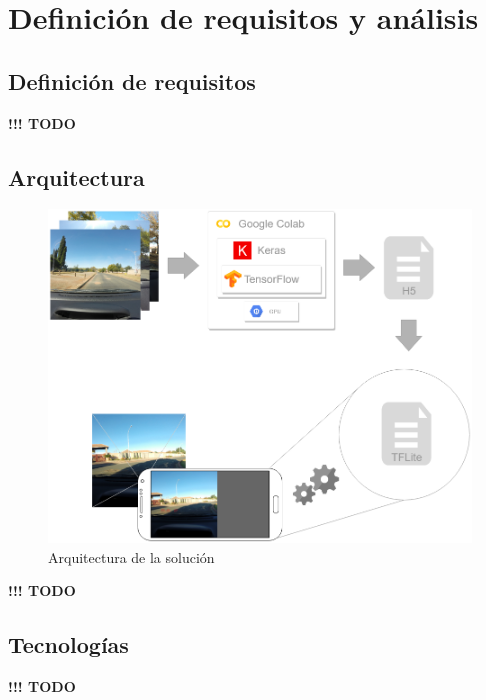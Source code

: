 \section{Definición de requisitos y análisis}
\label{sec:definicion_de_requisitos_y_analisis}

\subsection{Definición de requisitos}


{\color{red} \textbf{!!! TODO}}

\subsection{Arquitectura}


\begin{figure}[H]
	\centering
	\includegraphics[width=\linewidth]{images/architecture.png}
	\caption{Arquitectura de la solución}
	\label{fig:architecture}
\end{figure}

{\color{red} \textbf{!!! TODO}}

\subsection{Tecnologías}


{\color{red} \textbf{!!! TODO}}